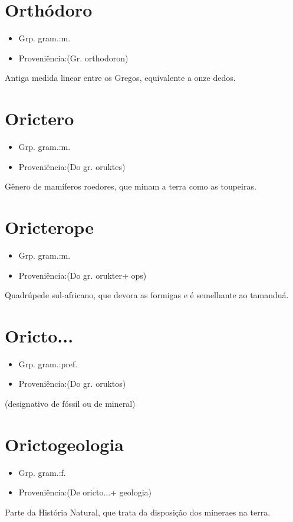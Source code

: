 \section{Orthódoro}
\begin{itemize}
\item {Grp. gram.:m.}
\end{itemize}
\begin{itemize}
\item {Proveniência:(Gr. \textunderscore orthodoron\textunderscore )}
\end{itemize}
Antiga medida linear entre os Gregos, equivalente a onze dedos.
\section{Orictero}
\begin{itemize}
\item {Grp. gram.:m.}
\end{itemize}
\begin{itemize}
\item {Proveniência:(Do gr. \textunderscore oruktes\textunderscore )}
\end{itemize}
Gênero de mamíferos roedores, que minam a terra como as toupeiras.
\section{Oricterope}
\begin{itemize}
\item {Grp. gram.:m.}
\end{itemize}
\begin{itemize}
\item {Proveniência:(Do gr. \textunderscore orukter\textunderscore  + \textunderscore ops\textunderscore )}
\end{itemize}
Quadrúpede sul-africano, que devora as formigas e é semelhante ao tamanduá.
\section{Oricto...}
\begin{itemize}
\item {Grp. gram.:pref.}
\end{itemize}
\begin{itemize}
\item {Proveniência:(Do gr. \textunderscore oruktos\textunderscore )}
\end{itemize}
(designativo de fóssil ou de mineral)
\section{Orictogeologia}
\begin{itemize}
\item {Grp. gram.:f.}
\end{itemize}
\begin{itemize}
\item {Proveniência:(De \textunderscore oricto...\textunderscore  + \textunderscore geologia\textunderscore )}
\end{itemize}
Parte da História Natural, que trata da disposição dos mineraes na terra.
